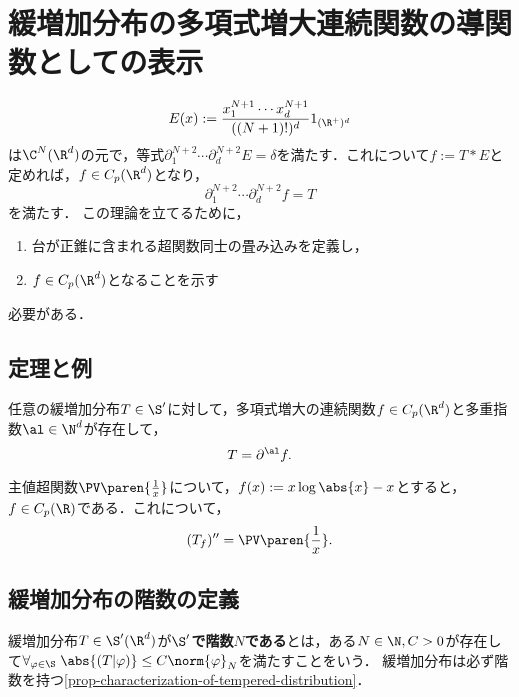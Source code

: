 \documentclass[uplatex,dvipdfmx]{jsreport}
\begin{document}
\section{緩増加分布の多項式増大連続関数の導関数としての表示}

\begin{tcolorbox}[colframe=ForestGreen, colback=ForestGreen!10!white,breakable,colbacktitle=ForestGreen!40!white,coltitle=black,fonttitle=\bfseries\sffamily,
title=]
    \[E(x):=\frac{x_1^{N+1}\cdots x^{N+1}_d}{((N+1)!)^d}1_{(\R^+)^d}\]
    は$\C^N(\R^d)$の元で，等式$\partial_1^{N+2}\cdots\partial^{N+2}_dE=\delta$を満たす．これについて$f:=T*E$と定めれば，$f\in C_p(\R^d)$となり，
    \[\partial^{N+2}_1\cdots\partial^{N+2}_df=T\]
    を満たす．
    この理論を立てるために，
    \begin{enumerate}
        \item 台が正錐に含まれる超関数同士の畳み込みを定義し，
        \item $f\in C_p(\R^d)$となることを示す
    \end{enumerate}
    必要がある．
\end{tcolorbox}

\subsection{定理と例}

\begin{theorem}
    任意の緩増加分布$T\in\S'$に対して，多項式増大の連続関数$f\in C_p(\R^d)$と多重指数$\al\in\N^d$が存在して，
    \[T=\partial^\al f.\]
\end{theorem}

\begin{example}
    主値超関数$\PV\paren{\frac{1}{x}}$について，$f(x):=x\log\abs{x}-x$とすると，$f\in C_p(\R)$である．これについて，
    \[(T_f)''=\PV\paren{\frac{1}{x}}.\]
\end{example}

\subsection{緩増加分布の階数の定義}

\begin{definition}
    緩増加分布$T\in\S'(\R^d)$が\textbf{$\S'$で階数$N$である}とは，ある$N\in\N,C>0$が存在して$\forall_{\varphi\in\S}\;\abs{(T|\varphi)}\le C\norm{\varphi}_N$を満たすことをいう．
    緩増加分布は必ず階数を持つ\ref{prop-characterization-of-tempered-distribution}．
\end{definition}
\end{document}

